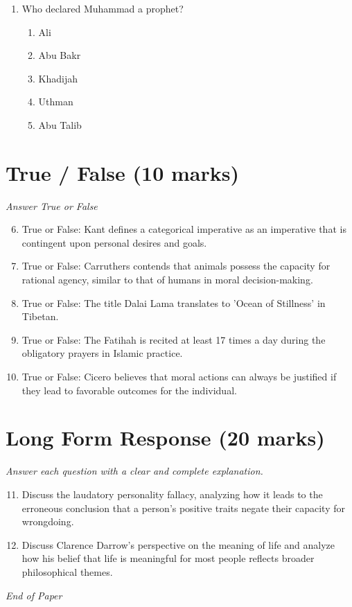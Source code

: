 \documentclass[12pt]{article}
\begin{document}
\begin{enumerate}[label=\arabic*.]
\begin{enumerate}[label=(\alph*)]
    \item \textasciitilde{}Mis
    \item Msi\textasciitilde{}
    \item M\textasciitilde{}ism
    \item \textasciitilde{}Mmis
    \item M\textasciitilde{}mis
\end{enumerate}
\item Who declared Muhammad a prophet?
\begin{enumerate}[label=(\alph*)]
    \item Ali
    \item Abu Bakr
    \item Khadijah
    \item Uthman
    \item Abu Talib
\end{enumerate}
\end{enumerate}

\section*{True / False (10 marks)}
\textit{Answer True or False}
\begin{enumerate}[label=\arabic*.]
\setcounter{enumi}{5}
\item True or False: Kant defines a categorical imperative as an imperative that is contingent upon personal desires and goals.
\item True or False: Carruthers contends that animals possess the capacity for rational agency, similar to that of humans in moral decision-making.
\item True or False: The title Dalai Lama translates to 'Ocean of Stillness' in Tibetan.
\item True or False: The Fatihah is recited at least 17 times a day during the obligatory prayers in Islamic practice.
\item True or False: Cicero believes that moral actions can always be justified if they lead to favorable outcomes for the individual.
\end{enumerate}

\section*{Long Form Response (20 marks)}
\textit{Answer each question with a clear and complete explanation.}
\begin{enumerate}[label=\arabic*.]
\setcounter{enumi}{10}
\item Discuss the laudatory personality fallacy, analyzing how it leads to the erroneous conclusion that a person's positive traits negate their capacity for wrongdoing.
\item Discuss Clarence Darrow's perspective on the meaning of life and analyze how his belief that life is meaningful for most people reflects broader philosophical themes.
\end{enumerate}

\vfill
\noindent\textit{End of Paper}
\end{document}
